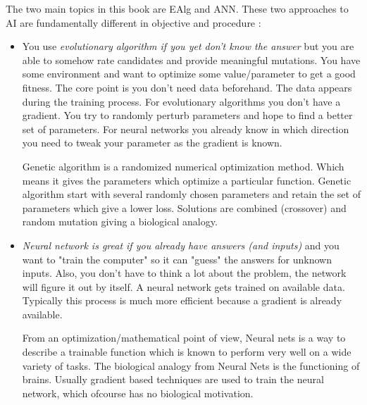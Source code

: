 The two main topics in this book are \ac{EAlg} and \ac{ANN}. These two approaches to \ac{AI} are fundamentally different in objective and procedure \cite{KamilTomsik2017,redditGAANN2017,QuoraGAANN2016}:
\begin{itemize}
\item
You use \textit{evolutionary algorithm if you yet don't know the answer} but you are able to somehow rate candidates and provide meaningful mutations.  You have some environment and want to optimize some value/parameter to get a good fitness. The core point is you don't need data beforehand. The data appears during the training process. For evolutionary algorithms you don't have a gradient. You try to randomly perturb parameters and hope to find a better set of parameters. For neural networks you already know in which direction you need to tweak your parameter as the gradient is known.

Genetic algorithm is a randomized numerical optimization method. Which means it gives the parameters which optimize a particular function. Genetic algorithm start with several randomly chosen parameters and retain the set of parameters which give a lower loss. Solutions are combined (crossover) and random mutation giving a biological analogy.

\item
\textit{Neural network is great if you already have answers (and inputs)} and you want to "train the computer" so it can "guess" the answers for unknown inputs. Also, you don't have to think a lot about the problem, the network will figure it out by itself.
A neural network gets trained on available data. Typically this process is much more efficient because a gradient is already available.

From an optimization/mathematical point of view, Neural nets is a way to describe a trainable function which is known to perform very well on a wide variety of tasks. The biological analogy from Neural Nets is the functioning of brains. Usually gradient based techniques are used to train the neural network, which ofcourse has no biological motivation.
\end{itemize}


